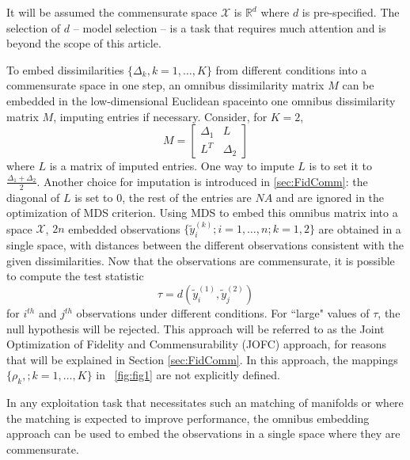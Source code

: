 \documentclass[11pt]{article} %
\begin{document}
It  will be assumed  the commensurate space  $\mathcal{X}$  is  $\mathbb{R}^d$ where $d$ is pre-specified. The selection of $d$ -- model selection -- is  a task that requires much attention and is  beyond the scope of this article.






To embed dissimilarities  $\{\Delta_k,k=1 ,\ldots,K\}$  from different conditions into a commensurate space in one step, an omnibus dissimilarity matrix  $M$ can be embedded in the low-dimensional Euclidean spaceinto one omnibus dissimilarity matrix $M$, imputing entries if necessary. Consider, for $K=2$, \begin{equation}
M=  \left[ \begin{array}{cc}
         \Delta_1 & L\\
        L^T  & \Delta_2 
     \end{array}  \right]     \label{omnibus} 
\end{equation} where $L$ is a matrix of imputed entries. One way to impute $L$ is to set it to $\frac{\Delta_1+\Delta_2}{2}$. Another choice for imputation is introduced in \ref{sec:FidComm}: the diagonal of $L$ is set to 0, the rest of the entries are $NA$ and are ignored in the optimization of MDS criterion.  
Using MDS to embed  this omnibus matrix into a  space  $\mathcal{X}$,  $2n$ embedded observations $\{\tilde{y}_i^{(k)}; i=1,\ldots,n;k=1,2\}$ are obtained in a single space, with distances between the different observations consistent with the given dissimilarities. Now that the observations are commensurate, it is possible to  compute the test statistic \[
\tau=d\left(\tilde{y}_i^{(1)},\tilde{y}_j^{(2)}\right)\label{teststat}
\] for $i^{th}$ and $j^{th}$ observations under different conditions.  For ``large" values of $\tau$, the null hypothesis will be rejected. This approach will be referred to as the Joint Optimization of Fidelity and Commensurability (JOFC) approach, for reasons that will be explained in Section \ref{sec:FidComm}. In this approach, the mappings   $\{ \rho_k,; k=1,\ldots,K\}$ in ~\ref{fig:fig1}  are not explicitly defined.


In any exploitation task that necessitates such an matching of manifolds or where the matching is expected to  improve performance, the omnibus embedding approach can be used  to embed the observations in a single space where they are commensurate. 
\end{document}
